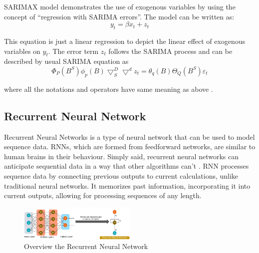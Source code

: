 \documentclass{ieeeojies}
\begin{document}
SARIMAX model demonstrates the use of exogenous variables by using the concept of “regression with SARIMA errors”. The model can be written as:
\begin{equation}
    y_t = \beta x_t + z_t
\end{equation}

This equation is just a linear regression to depict the linear effect of exogenous variables on $y_t$. The error term $z_t$ follows the SARIMA process and can be described by usual SARIMA equation as
\begin{equation}
    \Phi_P(B^S)\phi_p(B)\bigtriangledown_S^D\bigtriangledown^dz_t = \theta_q(B)\Theta_Q(B^S)\varepsilon_t
\end{equation}

where all the notations and operators have same meaning as above \cite{b4}.
\subsection{Recurrent Neural Network}
Recurrent Neural Networks is a type of neural network that can be used to model sequence data. RNNs, which are formed from feedforward networks, are similar to human brains in their behaviour. Simply said, recurrent neural networks can anticipate sequential data in a way that other algorithms can’t \cite{b10}. RNN processes sequence data by connecting previous outputs to current calculations, unlike traditional neural networks. It memorizes past information, incorporating it into current outputs, allowing for processing sequences of any length.
\begin{figure} [H]
    \centering
    \includegraphics[width=0.5\textwidth]{bibliography/Figure/RNN_overview.png}
    \caption{Overview the Recurrent Neural Network}
    \label{fig:rnn-overview}
\end{figure}
\end{document}
